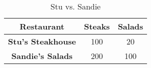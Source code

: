 \begin{table}[h]
  \centering
  \begin{tabular}{|c|c|c|}
    \hline
    \textbf{Restaurant} & \textbf{Steaks} & \textbf{Salads} \\
    \hline
    \textbf{Stu's Steakhouse} & 100 & 20 \\
    \hline
    \textbf{Sandie's Salads} & 200 & 100 \\
    \hline
  \end{tabular}
  \caption{Stu vs. Sandie}
\end{table}
